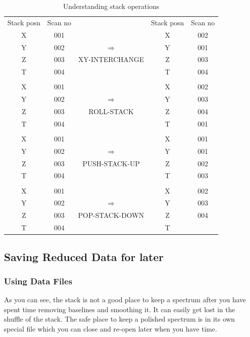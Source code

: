 \documentclass[11pt,twoside]{article}
\begin{document}
\begin{table}[htb]
\caption{Understanding stack operations}
\begin{center}
\begin{tabular}{ccccc}
Stack posn & Scan no &      & Stack posn & Scan no \\
X & 001 &                                & X & 002 \\
Y & 002 & {\huge $\Longrightarrow$}      & Y & 001 \\
Z & 003 & {\footnotesize XY-INTERCHANGE} & Z & 003 \\
T & 004 &                                & T & 004 \\
  &     &                                &   &     \\
X & 001 &                                & X & 002 \\
Y & 002 & {\huge $\Longrightarrow$}      & Y & 003 \\
Z & 003 & {\footnotesize ROLL-STACK}     & Z & 004 \\
T & 004 &                                & T & 001 \\
  &     &                                &   &     \\
X & 001 &                                & X & 001 \\
Y & 002 & {\huge $\Longrightarrow$}      & Y & 001 \\
Z & 003 & {\footnotesize PUSH-STACK-UP}  & Z & 002 \\
T & 004 &                                & T & 003 \\
  &     &                                &   &     \\
X & 001 &                                & X & 002 \\
Y & 002 & {\huge $\Longrightarrow$}      & Y & 003 \\
Z & 003 & {\footnotesize POP-STACK-DOWN} & Z & 004 \\
T & 004 &                                & T &     \\
\end{tabular}
\label{tab:specx_tab1}
\end{center}
\end{table}

\subsection{Saving Reduced Data for later}
\label{sec:specx_7}
\subsubsection{Using Data Files}
\label{sec:data-files}
As you can see, the stack is not a good place to keep a spectrum after
you have spent time removing baselines and smoothing it.  It can
easily get lost in the shuffle of the stack.  The safe place to keep a
polished spectrum is in its own special file which you can close and
re-open later when you have time.
\end{document}
